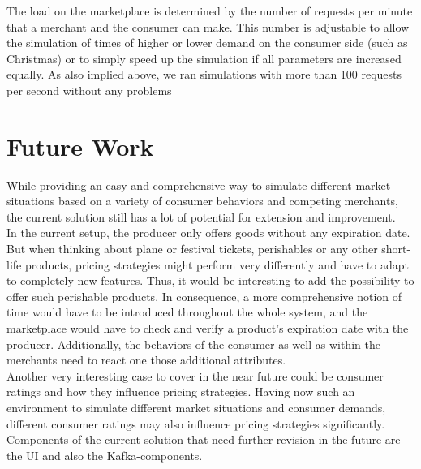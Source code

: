 The load on the marketplace is determined by the number of requests per minute that a merchant and the consumer can make. This number is adjustable to allow the simulation of times of higher or lower demand on the consumer side (such as Christmas) or to simply speed up the simulation if all parameters are increased equally. As also implied above, we ran simulations with more than 100 requests per second without any problems



\section{Future Work}
\label{sec:FutureWork}
%
While providing an easy and comprehensive way to simulate different market situations based on a variety of consumer behaviors and competing merchants, the current solution still has a lot of potential for extension and improvement. \\

In the current setup, the producer only offers goods without any expiration date. But when thinking about plane or festival tickets, perishables or any other short-life products, pricing strategies might perform very differently and have to adapt to completely new features. Thus, it would be interesting to add the possibility to offer such perishable products. In consequence, a more comprehensive notion of time would have to be introduced throughout the whole system, and the marketplace would have to check and verify a product's expiration date with the producer. Additionally, the behaviors of the consumer as well as within the merchants need to react one those additional attributes.\\

Another very interesting case to cover in the near future could be consumer ratings and how they influence pricing strategies. Having now such an environment to simulate different market situations and consumer demands, different consumer ratings may also influence pricing strategies significantly. \\

Components of the current solution that need further revision in the future are the UI and also the Kafka-components.

